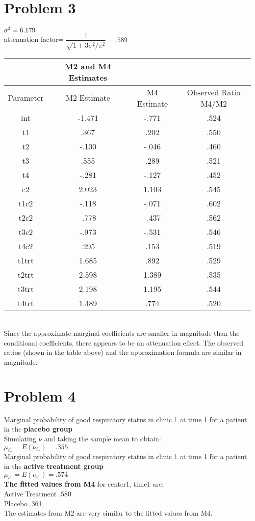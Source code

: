 \documentclass{article}
\newcommand{\sg}{\sigma}
\begin{document}
\begin{flushleft}
\section*{Problem 3}
$\sigma^2=6.179$\\
attenuation factor= $\dfrac{1}{\sqrt{1+3\sg^2/\pi^2}}=.589$\\
\begin{tabular}{cccc}
	\hline
	&M2 and M4 Estimates\\
	\hline
	Parameter & M2 Estimate & M4 Estimate&Observed Ratio M4/M2\\
	\hline
	int& -1.471&-.771&.524\\
	t1 & .367&.202&.550\\
	t2 &-.100&-.046&.460\\
	t3 &.555 &.289&.521\\
	t4 &-.281& -.127&.452\\
	c2 &2.023 &1.103&.545\\
	t1c2 &-.118&-.071&.602\\ 
	t2c2 &-.778&-.437&.562\\
	t3c2 &-.973&-.531&.546\\
	t4c2 &.295 &.153&.519 \\
	t1trt &1.685 &.892&.529\\
	t2trt &2.598&1.389&.535 \\
	t3trt &2.198  &1.195&.544\\
	t4trt & 1.489&  .774&.520\\
	\hline
\end{tabular}\\
\medbreak
Since the approximate marginal coefficients are smaller in magnitude than the conditional coefficients, there appears to be an attenuation effect. The observed ratios (shown in the table above) and the approximation formula are similar in magnitude.\\
\section*{Problem 4}
Marginal probability of good respiratory
status in clinic 1 at time 1 for a patient in the
\textbf{placebo group}\\
Simulating $\nu$ and taking the sample mean to obtain:\\
$\mu_{i1}=E(\nu_{i1})=.355$\\
Marginal probability of good respiratory
status in clinic 1 at time 1 for a patient in the
\textbf{active treatment group}\\
$\mu_{i1}=E(\nu_{i1})=.574$\\
\textbf{The fitted values from M4} for center1, time1 are:\\
Active Treatment .580\\
Placebo .361 \\
The estimates from M2 are very similar to the fitted values from M4.

\end{flushleft}
\end{document}
